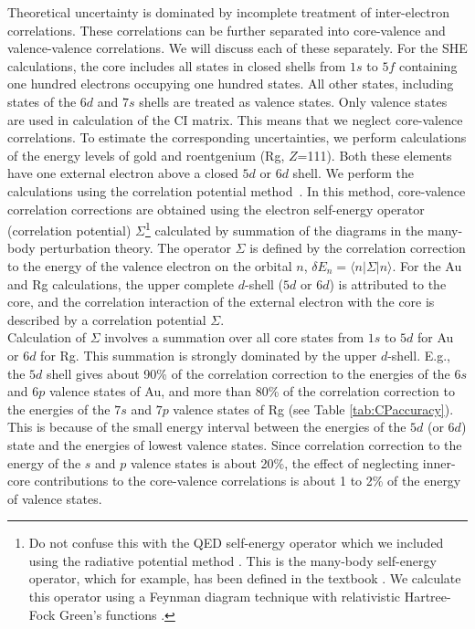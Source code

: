 \documentclass[10pt,a4paper, twoside]{report}
\begin{document}
Theoretical uncertainty is dominated by incomplete treatment of inter-electron correlations. These correlations can be further separated into core-valence and valence-valence correlations. We will discuss each of these separately. For the SHE calculations, the core includes all states in closed shells
from $1s$ to $5f$ containing one hundred electrons occupying one hundred states.
All other states, including states of the $6d$ and $7s$ shells are treated as
valence states. Only valence states are used in calculation of the CI matrix.
This means that we neglect core-valence correlations. To estimate the corresponding uncertainties, we perform calculations of the energy levels of gold and roentgenium (Rg, $Z$=111). Both these elements have one external electron above a closed $5d$ or $6d$ shell. We perform the calculations using the correlation potential method~\cite{Dzuba1988, DFSS1987_2}. In this method, core-valence correlation corrections are obtained using the electron self-energy operator (correlation potential) $\Sigma$\footnote{Do not confuse this with  the QED self-energy operator which we included using the radiative potential method \cite{FG2005}. This is the many-body self-energy operator, which for example, has been defined in the textbook \cite{LandauStatPhysPart2}. We calculate this operator using a Feynman diagram technique with relativistic Hartree-Fock Green's functions \cite{Dzuba1988}.} calculated by summation of the diagrams in the many-body perturbation theory.  The operator $\Sigma $ is defined by the correlation correction to the energy of the valence electron on the orbital $n$, $\delta E_n = \langle n | \Sigma | n \rangle$.   For the Au and Rg calculations, the upper complete $d$-shell ($5d$ or $6d$) is attributed to the core, and the correlation interaction of the external electron with the core is described by a correlation potential $\Sigma$.   \\

Calculation of $\Sigma$ involves a summation over all core states from
$1s$ to $5d$ for Au or $6d$ for Rg. This summation is strongly dominated by the upper $d$-shell. E.g., the $5d$ shell gives about 90\% of the correlation correction to the energies of the $6s$ and $6p$ valence states of Au, and more than 80\% of the correlation correction to the energies of the $7s$ and $7p$ valence states of Rg (see Table \ref{tab:CPaccuracy}). This is because of the small energy interval between the energies of
the $5d$ (or $6d$) state and the energies of lowest valence states.  Since correlation correction to the energy of the $s$ and $p$ valence states is about 20\%, the effect of neglecting inner-core contributions to the core-valence correlations is about 1 to 2\% of the energy of valence states.
\end{document}
